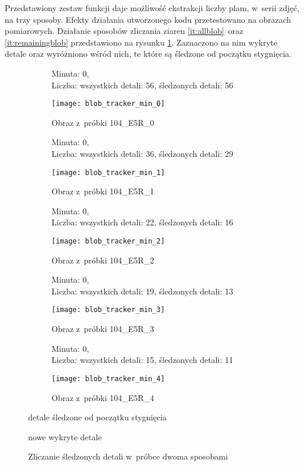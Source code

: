 Przedstawiony zestaw funkcji daje możliwość ekstrakcji liczby plam, w~serii
zdjęć, na trzy sposoby.
Efekty działania utworzonego kodu przetestowano na obrazach pomiarowych.
Działanie sposobów zliczania ziaren \ref{it:allblob}~oraz
\ref{it:remainingblob} przedstawiono na rysunku \ref{fig:blobcount}.
Zaznaczono na nim wykryte detale oraz wyróżniono wśród nich, te które
są śledzone od początku stygnięcia.
\begin{figure}[htbp]
	\centering
	\hfill
	\begin{subfigure}[t]{0.45\textwidth}
	    \centering
	    \caption*{\scriptsize
	        Minuta: 0, \\
	        Liczba: wszystkich detali: 56, śledzonych detali: 56}
		\texttt{[image: blob\_tracker\_min\_0]}
		\caption{Obraz z~próbki 104\_E5R\_0}
	\end{subfigure}
	\hfill
	\begin{subfigure}[t]{0.45\textwidth}
    	\centering
	    \caption*{\scriptsize
	        Minuta: 0, \\
	        Liczba: wszystkich detali: 36, śledzonych detali: 29}
		\texttt{[image: blob\_tracker\_min\_1]}
		\caption{Obraz z~próbki 104\_E5R\_1}
	\end{subfigure}
	\hfill
	\vfill
	\hfill
	\begin{subfigure}[t]{0.45\textwidth}
        \centering
	    \caption*{\scriptsize
	        Minuta: 0, \\
	        Liczba: wszystkich detali: 22, śledzonych detali: 16}
		\texttt{[image: blob\_tracker\_min\_2]}
		\caption{Obraz z~próbki 104\_E5R\_2}
	\end{subfigure}
	\hfill
	\begin{subfigure}[t]{0.45\textwidth}
    	\centering
	    \caption*{\scriptsize
	        Minuta: 0, \\
	        Liczba: wszystkich detali: 19, śledzonych detali: 13}
		\texttt{[image: blob\_tracker\_min\_3]}
		\caption{Obraz z~próbki 104\_E5R\_3}
	\end{subfigure}
	\hfill
	\vfill
	\begin{subfigure}[t]{0.45\textwidth}
    	\centering
	    \caption*{\scriptsize
	        Minuta: 0, \\
	        Liczba: wszystkich detali: 15, śledzonych detali: 11}
		\texttt{[image: blob\_tracker\_min\_4]}
		\caption{Obraz z~próbki 104\_E5R\_4}
	\end{subfigure}
		\begin{description} \footnotesize
	    \centering
        \item[Kolor czerwony] detale śledzone od początku stygnięcia
        \item[Kolor niebieski] nowe wykryte detale
	\end{description}
	\caption{Zliczanie śledzonych detali w~próbce dwoma sposobami}
	\label{fig:blobcount}
\end{figure}

